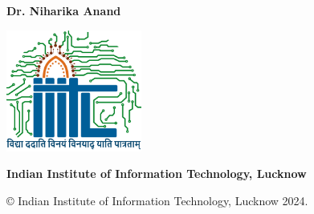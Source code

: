 \begin{center}
    {\bf{Dr. Niharika Anand}}
    
    \vspace{1.8cm}
    
    \includegraphics[height=4cm]{./Images/Logo_IIITL.png}
    
    \vspace{.5cm}
    {\bf\large{Indian Institute of Information Technology, Lucknow}}\\
    {\bf{}}
\end{center}

\medskip

\centerline{ \copyright{} Indian Institute of Information Technology, Lucknow 2024.}

\cleardoublepage




